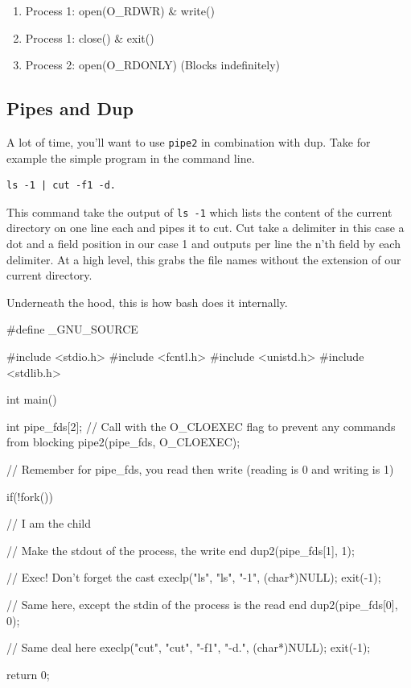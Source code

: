 \begin{enumerate}
\item Process 1: open(O\_RDWR) \& write()
\item Process 1: close() \& exit()
\item Process 2: open(O\_RDONLY) (Blocks indefinitely) 
\end{enumerate}

\subsection{Pipes and Dup}

A lot of time, you'll want to use \texttt{pipe2} in combination with dup. Take for example the simple program in the command line.

\begin{verbatim}
ls -1 | cut -f1 -d.
\end{verbatim}

This command take the output of \texttt{ls -1} which lists the content of the current directory on one line each and pipes it to cut.
Cut take a delimiter in this case a dot and a field position in our case 1 and outputs per line the n'th field by each delimiter.
At a high level, this grabs the file names without the extension of our current directory.

Underneath the hood, this is how bash does it internally.


\begin{lstlistings}[language=C]
#define _GNU_SOURCE

#include <stdio.h>
#include <fcntl.h>
#include <unistd.h>
#include <stdlib.h>

int main() {

    int pipe_fds[2];
    // Call with the O_CLOEXEC flag to prevent any commands from blocking
    pipe2(pipe_fds, O_CLOEXEC);

    // Remember for pipe_fds, you read then write (reading is 0 and writing is 1)

    if(!fork()) {
        // I am the child

        // Make the stdout of the process, the write end
        dup2(pipe_fds[1], 1);

        // Exec! Don't forget the cast
        execlp("ls", "ls", "-1", (char*)NULL);
        exit(-1);
    }

    // Same here, except the stdin of the process is the read end
    dup2(pipe_fds[0], 0);

    // Same deal here
    execlp("cut", "cut", "-f1", "-d.", (char*)NULL);
    exit(-1);

    return 0;
}
\end{lstlistings}

